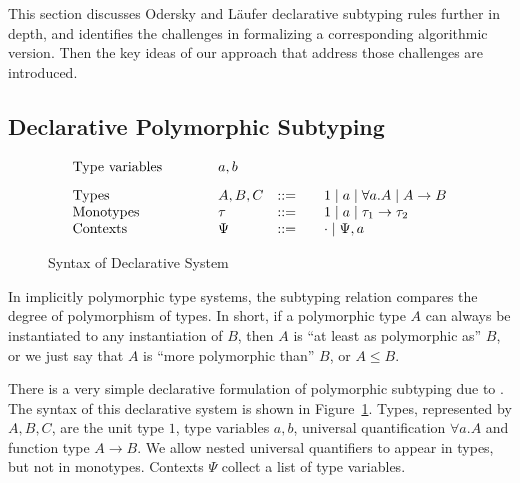 
This section discusses Odersky and L\"aufer declarative subtyping rules further in depth,
and identifies the challenges in formalizing a corresponding
algorithmic version. Then the key ideas of our approach that address
those challenges are introduced.


\begin{comment}
The subtyping relation is typically
used by the subsumption rule for type inference, e.g.
$$\inferrule*[right=Sub]
  {\Gamma\vdash t : A \quad A\le B}
  {\Gamma\vdash t : B}
$$
where $t$ represents a term, and the relation $\Gamma\vdash t : A$
reads ``term $t$ has type $A$ under context $\Gamma$''.
\end{comment}

\subsection{Declarative Polymorphic Subtyping}\label{declarative_subtyping}

\begin{figure}[t]
\[
\begin{array}{l@{\qquad}lcl}
\text{Type variables}\qquad&a, b\\[3mm]
\text{Types}\qquad&A, B, C &::=&\quad 1 \mid a \mid \forall a. A \mid A\to B\\
\text{Monotypes}\qquad&\tau &::=&\quad 1 \mid a \mid \tau_1\to \tau_2\\
\text{Contexts}\qquad&\Psi &::=&\quad \cdot \mid \Psi, a\\
\end{array}
\]
\caption{Syntax of Declarative System}\label{fig:ITP:decl:syntax}
\end{figure}


In implicitly polymorphic type systems, the subtyping relation
compares the degree of polymorphism of types. In short, if a
polymorphic type $A$ can always be instantiated to any instantiation
of $B$, then $A$ is ``at least as polymorphic as'' $B$, or we just say
that $A$ is ``more polymorphic than'' $B$, or $A\le B$.  

There is a very simple declarative formulation of
polymorphic subtyping due to \citet{odersky1996putting}. The syntax
of this declarative system is shown in Figure~\ref{fig:ITP:decl:syntax}. Types,
represented by $A, B, C$, are the unit type $1$, type variables
$a, b$, universal quantification $\forall a. A$ and function type
$A\to B$. We allow nested universal quantifiers to appear in
types, but not in monotypes. Contexts $\Psi$ collect a list
of type variables.


